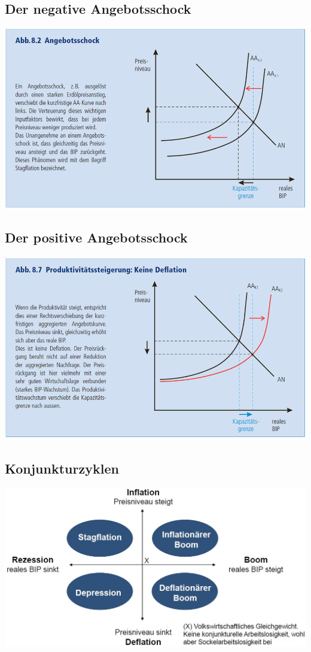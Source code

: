 \subsection{Der negative Angebotsschock}
\includegraphics[width=0.85\linewidth]{images/negangebot.png}
\clearpage
\pagebreak
\subsection{Der positive Angebotsschock}
\includegraphics[width=0.85\linewidth]{images/posangebot.png}
\subsection{Konjunkturzyklen}
\includegraphics[width=0.85\linewidth]{images/konjukturzyklen.jpg}
\vspace{-0.5cm}
